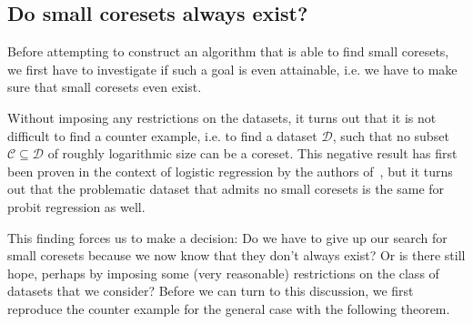 \subsection{Do small coresets always exist?}

Before attempting to construct an algorithm that
is able to find small coresets, we first
have to investigate if such a goal is even attainable,
i.e. we have to make sure that small coresets even exist.

Without imposing any restrictions on the datasets, it turns out
that it is not difficult to find a counter example, i.e. to find
a dataset $\mathcal{D}$, such that no subset
$\mathcal{C} \subseteq \mathcal{D}$ of roughly logarithmic size
can be a coreset. This negative result has first been
proven in the context of logistic regression by the
authors of~\cite{on-coresets}, but it turns out that
the problematic dataset that admits no small coresets is
the same for probit regression as well.

This finding forces us to make a decision:
Do we have to give up our search for small coresets because
we now know that they don't always exist?
Or is there still hope, perhaps by imposing some (very reasonable)
restrictions on the class of datasets that we consider?
Before we can turn to this discussion, we first reproduce
the counter example for the general case with the following theorem.

